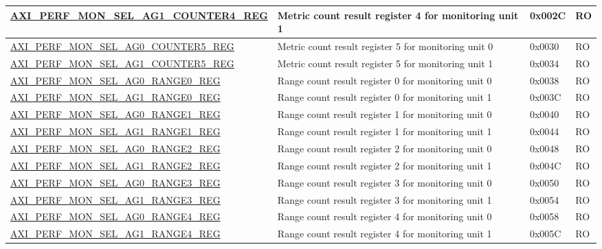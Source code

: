 \begin{longtable}{ | p{9.1cm} | p{5cm} | p{1.3cm} | p{1.4cm} | }
\hyperref[regdesc:AXIPERFMONSELAGNCOUNTERMREG]{AXI\_PERF\_MON\_SEL\_AG1\_COUNTER4\_REG} & Metric count result register 4 for monitoring unit 1 & 0x002C & RO\\ \hline
\hyperref[regdesc:AXIPERFMONSELAGNCOUNTERMREG]{AXI\_PERF\_MON\_SEL\_AG0\_COUNTER5\_REG} & Metric count result register 5 for monitoring unit 0 & 0x0030 & RO\\ \hline
\hyperref[regdesc:AXIPERFMONSELAGNCOUNTERMREG]{AXI\_PERF\_MON\_SEL\_AG1\_COUNTER5\_REG} & Metric count result register 5 for monitoring unit 1 & 0x0034 & RO\\ \hline
\hyperref[regdesc:AXIPERFMONSELAGNRANGEMREG]{AXI\_PERF\_MON\_SEL\_AG0\_RANGE0\_REG} & Range count result register 0 for monitoring unit 0 & 0x0038 & RO\\ \hline
\hyperref[regdesc:AXIPERFMONSELAGNRANGEMREG]{AXI\_PERF\_MON\_SEL\_AG1\_RANGE0\_REG} & Range count result register 0 for monitoring unit 1 & 0x003C & RO\\ \hline
\hyperref[regdesc:AXIPERFMONSELAGNRANGEMREG]{AXI\_PERF\_MON\_SEL\_AG0\_RANGE1\_REG} & Range count result register 1 for monitoring unit 0 & 0x0040 & RO\\ \hline
\hyperref[regdesc:AXIPERFMONSELAGNRANGEMREG]{AXI\_PERF\_MON\_SEL\_AG1\_RANGE1\_REG} & Range count result register 1 for monitoring unit 1 & 0x0044 & RO\\ \hline
\hyperref[regdesc:AXIPERFMONSELAGNRANGEMREG]{AXI\_PERF\_MON\_SEL\_AG0\_RANGE2\_REG} & Range count result register 2 for monitoring unit 0 & 0x0048 & RO\\ \hline
\hyperref[regdesc:AXIPERFMONSELAGNRANGEMREG]{AXI\_PERF\_MON\_SEL\_AG1\_RANGE2\_REG} & Range count result register 2 for monitoring unit 1 & 0x004C & RO\\ \hline
\hyperref[regdesc:AXIPERFMONSELAGNRANGEMREG]{AXI\_PERF\_MON\_SEL\_AG0\_RANGE3\_REG} & Range count result register 3 for monitoring unit 0 & 0x0050 & RO\\ \hline
\hyperref[regdesc:AXIPERFMONSELAGNRANGEMREG]{AXI\_PERF\_MON\_SEL\_AG1\_RANGE3\_REG} & Range count result register 3 for monitoring unit 1 & 0x0054 & RO\\ \hline
\hyperref[regdesc:AXIPERFMONSELAGNRANGEMREG]{AXI\_PERF\_MON\_SEL\_AG0\_RANGE4\_REG} & Range count result register 4 for monitoring unit 0 & 0x0058 & RO\\ \hline
\hyperref[regdesc:AXIPERFMONSELAGNRANGEMREG]{AXI\_PERF\_MON\_SEL\_AG1\_RANGE4\_REG} & Range count result register 4 for monitoring unit 1 & 0x005C & RO\\ \hline

\end{longtable}
